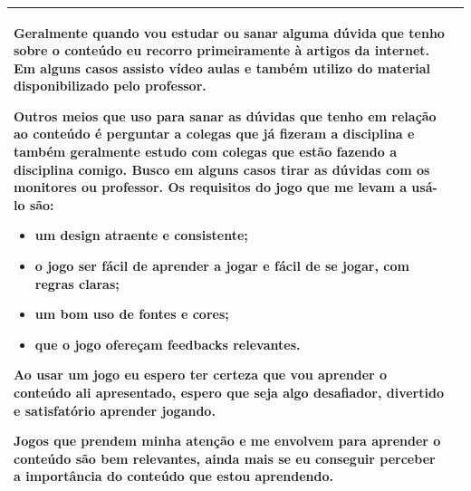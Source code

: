 \begin{table}[htbp]
\begin{tabular}{| m{} m{}|}
{        Geralmente quando vou estudar ou sanar alguma dúvida que tenho sobre o conteúdo eu recorro primeiramente à artigos da internet. Em alguns casos assisto vídeo aulas e também utilizo do material disponibilizado pelo professor.
        
        Outros meios que uso para sanar as dúvidas que tenho em relação ao conteúdo é perguntar a colegas que já fizeram a disciplina e também geralmente estudo com colegas que estão fazendo a disciplina comigo. Busco em alguns casos tirar as dúvidas com os monitores ou professor.
        Os requisitos do jogo que me levam a usá-lo são: 
        \begin{itemize}
            \item um design atraente e consistente; 
            \item o jogo ser fácil de aprender a jogar e fácil de se jogar, com regras claras; 
            \item um bom uso de fontes e cores; 
            \item que o jogo ofereçam feedbacks relevantes. 
        \end{itemize}
        
        Ao usar um jogo eu espero ter certeza que vou  aprender o conteúdo ali apresentado, espero que seja algo desafiador, divertido e satisfatório aprender jogando. 
        
        Jogos que prendem minha atenção e me envolvem para aprender o conteúdo são bem relevantes, ainda mais se eu conseguir perceber a importância do conteúdo que estou aprendendo.} \\ \hline
\end{tabular}
\end{table}